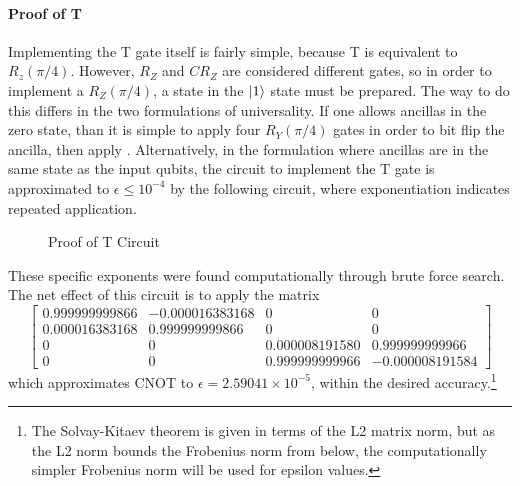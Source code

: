 \documentclass[12pt]{article}
\begin{document}
\paragraph{Proof of T}
Implementing the T gate itself is fairly simple, because T is equivalent to $R_z(\pi/4)$. However, $R_Z$ and $CR_Z$ are considered different gates, so in order to implement a $R_Z(\pi/4)$, a state in the $\ket{1}$ state must be prepared. The way to do this differs in the two formulations of universality. If one allows ancillas in the zero state, than it is simple to apply four $R_Y(\pi/4)$ gates in order to bit flip the ancilla, then apply .
Alternatively, in the formulation where ancillas are in the same state as the input qubits, the circuit to implement the T gate is approximated to $\epsilon \le 10^{-4}$ by the following circuit, where exponentiation indicates repeated application.
\begin{figure}[h]
    \centering
    \caption{Proof of T Circuit}
    \label{fig:quantum universal set 1 proof of T circuit}
\end{figure}

These specific exponents were found computationally through brute force search.
The net effect of this circuit is to apply the matrix
$$
\begin{bmatrix}
    0.999999999866&-0.000016383168&0&0\\
    0.000016383168& 0.999999999866&0&0\\
    0&0&0.000008191580& 0.999999999966\\
    0&0&0.999999999966&-0.000008191584
\end{bmatrix}
$$
which approximates CNOT to $\epsilon = 2.59041 \times 10^{-5}$, within the desired accuracy.\footnote{The Solvay-Kitaev theorem is given in terms of the L2 matrix norm, but as the L2 norm bounds the Frobenius norm from below, the computationally simpler Frobenius norm will be used for epsilon values.}
\end{document}
